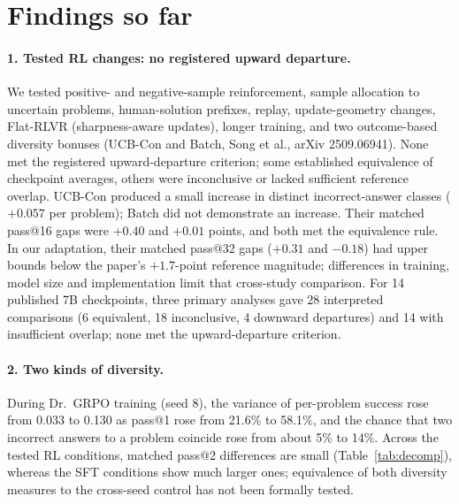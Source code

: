 \documentclass[11pt]{article}
\begin{document}
\section{Findings so far}
\paragraph{1. Tested RL changes: no registered upward departure.}
We tested positive- and negative-sample reinforcement, sample allocation to uncertain problems, human-solution
prefixes, replay, update-geometry changes, Flat-RLVR (sharpness-aware updates), longer training, and two
outcome-based diversity bonuses (UCB-Con and Batch, Song et al., arXiv 2509.06941). None met the registered
upward-departure criterion; some established equivalence of checkpoint averages, others were inconclusive or lacked
sufficient reference overlap. UCB-Con produced a small increase in distinct incorrect-answer classes ($+0.057$ per
problem); Batch did not demonstrate an increase. Their matched pass@16 gaps were $+0.40$ and $+0.01$ points, and both
met the equivalence rule. In our adaptation, their matched pass@32 gaps ($+0.31$ and $-0.18$) had upper bounds below
the paper's $+1.7$-point reference magnitude; differences in training, model size and implementation limit that
cross-study comparison. For 14 published 7B checkpoints, three primary analyses gave 28 interpreted comparisons
(6 equivalent, 18 inconclusive, 4 downward departures) and 14 with insufficient overlap; none met the upward-departure
criterion.

\paragraph{2. Two kinds of diversity.}
During Dr.~GRPO training (seed 8), the variance of per-problem success rose from 0.033 to 0.130 as pass@1 rose from
21.6\% to 58.1\%, and the chance that two incorrect answers to a problem coincide rose from about 5\% to 14\%. Across
the tested RL conditions, matched pass@2 differences are small (Table~\ref{tab:decomp}), whereas the SFT conditions
show much larger ones; equivalence of both diversity measures to the cross-seed control has not been formally tested.
\end{document}
